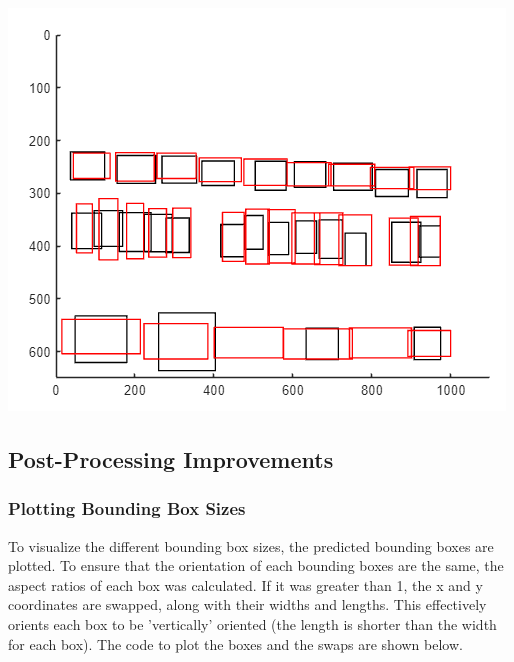 \documentclass[man]{apa7}
\begin{document}
\begin{minipage}{\linewidth}
  \includegraphics[]{figures/plottedBoxesUnimproved.png}
  \label{fig:unimprovedBoxes}
\end{minipage}

\subsection{Post-Processing Improvements}

\subsubsection{Plotting Bounding Box Sizes}

To visualize the different bounding box sizes, the predicted bounding boxes are plotted. To ensure that the orientation of each bounding boxes are the same, the aspect ratios of each box was calculated. If it was greater than 1, the x and y coordinates are swapped, along with their widths and lengths. This effectively orients each box to be 'vertically' oriented (the length is shorter than the width for each box). The code to plot the boxes and the swaps are shown below. 

\newpage
\end{document}
